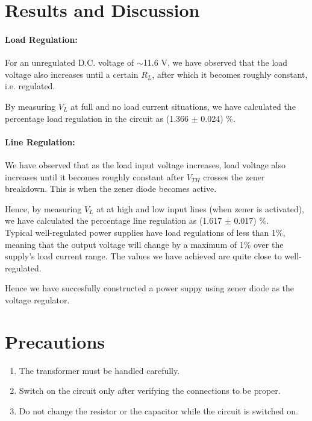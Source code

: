 \section{Results and Discussion}
    \paragraph*{\textbf{Load Regulation:}} For an unregulated D.C. voltage of $\sim$11.6 V, we have observed that the load voltage also increases until a certain $R_L$, after which it becomes roughly constant, i.e. regulated. 
        
        By measuring $V_L$ at full and no load current situations, we have calculated the percentage load regulation in the circuit as (1.366 $\pm$ 0.024) \%.

    \paragraph*{\textbf{Line Regulation:}} We have observed that as the load input voltage increases, load voltage also increases until it becomes roughly constant after $V_{TH}$ crosses the zener breakdown. This is when the zener diode becomes active.

        Hence, by measuring $V_L$ at at high and low input lines (when zener is activated), we have calculated the percentage line regulation as (1.617 $\pm$ 0.017) \%.\\

        Typical well-regulated power supplies have load regulations of less than 1\%, meaning that the output voltage will change by a maximum of 1\% over the supply’s load current range. The values we have achieved are quite close to well-regulated.

        Hence we have succesfully constructed a power suppy using zener diode as the voltage regulator.

\section{Precautions}
\begin{enumerate}
    \item The transformer must be handled carefully.
    \item Switch on the circuit only after verifying the connections to be proper.
    \item Do not change the resistor or the capacitor while the circuit is switched on.
\end{enumerate}